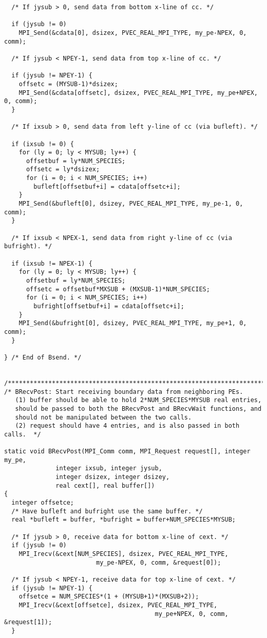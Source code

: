 \begin{verbatim}
  /* If jysub > 0, send data from bottom x-line of cc. */

  if (jysub != 0)
    MPI_Send(&cdata[0], dsizex, PVEC_REAL_MPI_TYPE, my_pe-NPEX, 0, comm);

  /* If jysub < NPEY-1, send data from top x-line of cc. */

  if (jysub != NPEY-1) {
    offsetc = (MYSUB-1)*dsizex;
    MPI_Send(&cdata[offsetc], dsizex, PVEC_REAL_MPI_TYPE, my_pe+NPEX, 0, comm);
  }

  /* If ixsub > 0, send data from left y-line of cc (via bufleft). */

  if (ixsub != 0) {
    for (ly = 0; ly < MYSUB; ly++) {
      offsetbuf = ly*NUM_SPECIES;
      offsetc = ly*dsizex;
      for (i = 0; i < NUM_SPECIES; i++)
        bufleft[offsetbuf+i] = cdata[offsetc+i];
    }
    MPI_Send(&bufleft[0], dsizey, PVEC_REAL_MPI_TYPE, my_pe-1, 0, comm);   
  }

  /* If ixsub < NPEX-1, send data from right y-line of cc (via bufright). */

  if (ixsub != NPEX-1) {
    for (ly = 0; ly < MYSUB; ly++) {
      offsetbuf = ly*NUM_SPECIES;
      offsetc = offsetbuf*MXSUB + (MXSUB-1)*NUM_SPECIES;
      for (i = 0; i < NUM_SPECIES; i++)
        bufright[offsetbuf+i] = cdata[offsetc+i];
    }
    MPI_Send(&bufright[0], dsizey, PVEC_REAL_MPI_TYPE, my_pe+1, 0, comm);   
  }

} /* End of Bsend. */

 
/*************************************************************************/
/* BRecvPost: Start receiving boundary data from neighboring PEs.
   (1) buffer should be able to hold 2*NUM_SPECIES*MYSUB real entries,
   should be passed to both the BRecvPost and BRecvWait functions, and
   should not be manipulated between the two calls.
   (2) request should have 4 entries, and is also passed in both calls.  */

static void BRecvPost(MPI_Comm comm, MPI_Request request[], integer my_pe,
		      integer ixsub, integer jysub,
		      integer dsizex, integer dsizey,
		      real cext[], real buffer[])
{
  integer offsetce;
  /* Have bufleft and bufright use the same buffer. */
  real *bufleft = buffer, *bufright = buffer+NUM_SPECIES*MYSUB;

  /* If jysub > 0, receive data for bottom x-line of cext. */
  if (jysub != 0)
    MPI_Irecv(&cext[NUM_SPECIES], dsizex, PVEC_REAL_MPI_TYPE,
    					 my_pe-NPEX, 0, comm, &request[0]);

  /* If jysub < NPEY-1, receive data for top x-line of cext. */
  if (jysub != NPEY-1) {
    offsetce = NUM_SPECIES*(1 + (MYSUB+1)*(MXSUB+2));
    MPI_Irecv(&cext[offsetce], dsizex, PVEC_REAL_MPI_TYPE,
                                         my_pe+NPEX, 0, comm, &request[1]);
  }


\end{verbatim}
